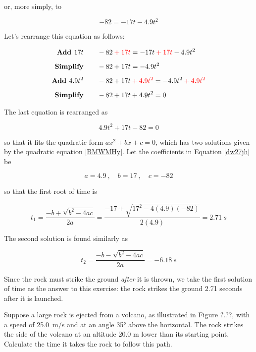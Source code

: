 \documentclass[main-physics.tex]{subfiles}
\begin{document}
or, more simply, to

\begin{equation*}
     -82 = - 17 t -4.9 t^2
\end{equation*}

Let's rearrange this equation as follows:

\begin{align*}
    \textbf{Add $17t$} \qquad & - 82 \mathbin{\color{red} +} \textcolor{red}{17t} = -17t \mathbin{\color{red} +} \textcolor{red}{17t} - 4.9 t^2 \\[1ex]
    \textbf{Simplify} \qquad & -82 + 17t = -4.9t^2\\[1ex]
    \textbf{Add $4.9 t^2$} \qquad & -82 + 17t \mathbin{\color{red} +} \textcolor{red}{4.9 t^2} = -4.9t^2 \mathbin{\color{red} +} \textcolor{red}{4.9 t^2}\\[1ex]
    \textbf{Simplify} \qquad & -82 + 17t + 4.9t^2 = 0
\end{align*}

The last equation is rearranged as 

\begin{equation} \label{dw27jh}
    4.9 t^2 + 17t - 82 = 0
\end{equation}

so that it fits the quadratic form $ax^2 + bx + c = 0$, which has two solutions given by the quadratic equation \eqref{BMWMHy}. Let the coefficients in Equation \eqref{dw27jh} be

\begin{equation*}
    a = 4.9\ , \quad b = 17\ ,\quad c = -82
\end{equation*}

so that the first root of time is

\begin{equation*}
    t_1 = \frac{-b + \sqrt{b^2 - 4ac}}{2a} = \frac{-17 + \sqrt{17^2 - 4(4.9)(-82)}}{2(4.9)} = \SI{2.71}{s}
\end{equation*}

The second solution is found similarly as

\begin{equation*}
    t_2 = \frac{-b - \sqrt{b^2 - 4ac}}{2a} = \SI{-6.18}{s}
\end{equation*}

Since the rock must strike the ground \textit{after} it is thrown, we take the first solution of time as the answer to this exercise: the rock strikes the ground 2.71 seconds after it is launched. 

\endsolution

\begin{example}
    Suppose a large rock is ejected from a volcano, as illustrated in Figure ?.??, with a speed of  \SI{25.0}{m/s} and at an angle \ang{35} above the horizontal. The rock strikes the side of the volcano at an altitude 20.0 m lower than its starting point. Calculate the time it takes the rock to follow this path.
\end{example}
\end{document}
